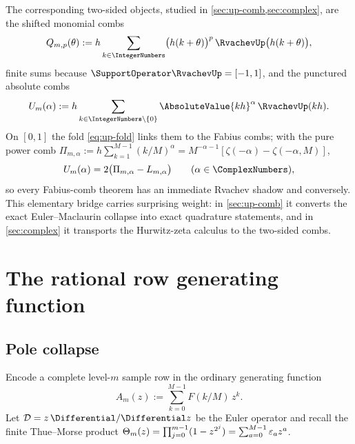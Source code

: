 The corresponding two-sided objects, studied in
\cref{sec:up-comb,sec:complex}, are the shifted monomial combs
\begin{equation}
 Q_{m,p}(\theta)
 :=h\sum_{k\in\IntegerNumbers}\bigl(h(k+\theta)\bigr)^{p}\,
 \RvachevUp\bigl(h(k+\theta)\bigr),
 \label{eq:Qmp}
\end{equation}
finite sums because $\SupportOperator\RvachevUp=[-1,1]$, and the punctured absolute combs
\begin{equation}
 U_m(\alpha)
 :=h\sum_{k\in\IntegerNumbers\setminus\{0\}}\AbsoluteValue{kh}^{\alpha}\,\RvachevUp(kh).
 \label{eq:A-alpha-def}
\end{equation}
On $[0,1]$ the fold \eqref{eq:up-fold} links them to the Fabius combs;
with the pure power comb
$\Pi_{m,\alpha}:=h\sum_{k=1}^{M-1}(k/M)^{\alpha}
=M^{-\alpha-1}[\zeta(-\alpha)-\zeta(-\alpha,M)]$,
\begin{equation}
 U_m(\alpha)=2\bigl(\Pi_{m,\alpha}-L_{m,\alpha}\bigr)
 \qquad(\alpha\in\ComplexNumbers),
 \label{eq:U-relation}
\end{equation}
so every Fabius-comb theorem has an immediate Rvachev shadow and
conversely.  This elementary bridge carries surprising weight: in
\cref{sec:up-comb} it converts the exact Euler--Maclaurin collapse into
exact quadrature statements, and in \cref{sec:complex} it transports
the Hurwitz-zeta calculus to the two-sided combs.

\section{The rational row generating function}
\label{sec:row}

\subsection{Pole collapse}

Encode a complete level-$m$ sample row in the ordinary generating
function
\begin{equation}
 A_m(z):=\sum_{k=0}^{M-1}F(k/M)\,z^{k}.
 \label{eq:AN}
\end{equation}
Let $\Dop=z\,\Differential/\Differential z$ be the Euler operator and recall the finite
Thue--Morse product
$\Theta_m(z)=\prod_{j=0}^{m-1}(1-z^{2^{j}})
=\sum_{a=0}^{M-1}\varepsilon_a z^{a}$.

